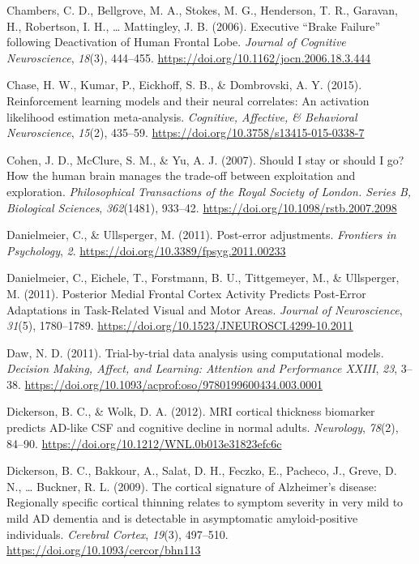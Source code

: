 \documentclass[12pt,openany]{book}
\theoremstyle{definition}
\theoremstyle{definition}
\theoremstyle{definition}
\theoremstyle{remark}
\begin{document}
\hypertarget{ref-Chambers2006}{}
Chambers, C. D., Bellgrove, M. A., Stokes, M. G., Henderson, T. R.,
Garavan, H., Robertson, I. H., \ldots{} Mattingley, J. B. (2006).
Executive ``Brake Failure'' following Deactivation of Human Frontal
Lobe. \emph{Journal of Cognitive Neuroscience}, \emph{18}(3), 444--455.
\url{https://doi.org/10.1162/jocn.2006.18.3.444}

\hypertarget{ref-Chase2015}{}
Chase, H. W., Kumar, P., Eickhoff, S. B., \& Dombrovski, A. Y. (2015).
Reinforcement learning models and their neural correlates: An activation
likelihood estimation meta-analysis. \emph{Cognitive, Affective, \&
Behavioral Neuroscience}, \emph{15}(2), 435--59.
\url{https://doi.org/10.3758/s13415-015-0338-7}

\hypertarget{ref-Cohen2007}{}
Cohen, J. D., McClure, S. M., \& Yu, A. J. (2007). Should I stay or
should I go? How the human brain manages the trade-off between
exploitation and exploration. \emph{Philosophical Transactions of the
Royal Society of London. Series B, Biological Sciences},
\emph{362}(1481), 933--42. \url{https://doi.org/10.1098/rstb.2007.2098}

\hypertarget{ref-Danielmeier2011b}{}
Danielmeier, C., \& Ullsperger, M. (2011). Post-error adjustments.
\emph{Frontiers in Psychology}, \emph{2}.
\url{https://doi.org/10.3389/fpsyg.2011.00233}

\hypertarget{ref-Danielmeier2011}{}
Danielmeier, C., Eichele, T., Forstmann, B. U., Tittgemeyer, M., \&
Ullsperger, M. (2011). Posterior Medial Frontal Cortex Activity Predicts
Post-Error Adaptations in Task-Related Visual and Motor Areas.
\emph{Journal of Neuroscience}, \emph{31}(5), 1780--1789.
\url{https://doi.org/10.1523/JNEUROSCI.4299-10.2011}

\hypertarget{ref-Daw2011}{}
Daw, N. D. (2011). Trial-by-trial data analysis using computational
models. \emph{Decision Making, Affect, and Learning: Attention and
Performance XXIII}, \emph{23}, 3--38.
\url{https://doi.org/10.1093/acprof:oso/9780199600434.003.0001}

\hypertarget{ref-Dickerson2012}{}
Dickerson, B. C., \& Wolk, D. A. (2012). MRI cortical thickness
biomarker predicts AD-like CSF and cognitive decline in normal adults.
\emph{Neurology}, \emph{78}(2), 84--90.
\url{https://doi.org/10.1212/WNL.0b013e31823efc6c}

\hypertarget{ref-Dickerson2009}{}
Dickerson, B. C., Bakkour, A., Salat, D. H., Feczko, E., Pacheco, J.,
Greve, D. N., \ldots{} Buckner, R. L. (2009). The cortical signature of
Alzheimer's disease: Regionally specific cortical thinning relates to
symptom severity in very mild to mild AD dementia and is detectable in
asymptomatic amyloid-positive individuals. \emph{Cerebral Cortex},
\emph{19}(3), 497--510. \url{https://doi.org/10.1093/cercor/bhn113}
\end{document}
